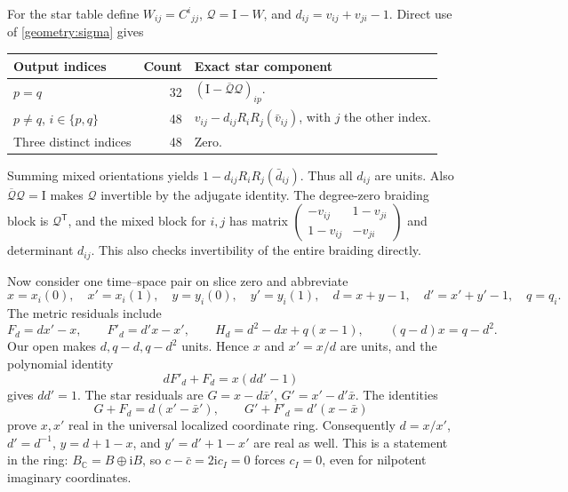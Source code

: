 \documentclass[11pt,a4paper]{article}
\theoremstyle{remark}\newtheorem{remark}[theorem]{Remark}
\newcommand{\Id}{\mathrm I}\newcommand{\F}{\mathbb F}
\begin{document}
For the star table define \(W_{ij}=C^i{}_{jj}\),
\(\mathscr Q=\Id-W\), and \(d_{ij}=v_{ij}+v_{ji}-1\).
Direct use of \eqref{geometry:sigma} gives
\begin{center}\small
\begin{tabular}{p{.31\linewidth}rp{.55\linewidth}}
\hline
Output indices&Count&Exact star component\\\hline
\(p=q\)&32&\((\Id-\overline{\mathscr Q}\mathscr Q)_{ip}\).\\
\(p\ne q\), \(i\in\{p,q\}\)&48&
\(v_{ij}-d_{ij}R_iR_j(\bar v_{ij})\), with \(j\) the other index.\\
Three distinct indices&48&Zero.\\\hline
\end{tabular}
\end{center}
Summing mixed orientations yields
\(1-d_{ij}R_iR_j(\bar d_{ij})\). Thus all \(d_{ij}\) are units.
Also \(\overline{\mathscr Q}\mathscr Q=\Id\) makes
\(\mathscr Q\) invertible by the adjugate identity. The degree-zero
braiding block is \(\mathscr Q^{\mathsf T}\), and the mixed block for
\(i,j\) has matrix
\(\left(\begin{smallmatrix}-v_{ij}&1-v_{ji}\\
1-v_{ij}&-v_{ji}\end{smallmatrix}\right)\)
and determinant \(d_{ij}\). This also checks invertibility of the entire
braiding directly.

Now consider one time--space pair on slice zero and abbreviate
\[
 x=x_i(0),\quad x'=x_i(1),\quad y=y_i(0),\quad y'=y_i(1),
 \quad d=x+y-1,\quad d'=x'+y'-1,\quad q=q_i.
\]
The metric residuals include
\[
 F_d=dx'-x,\qquad F'_d=d'x-x',\qquad
 H_d=d^2-dx+q(x-1),\qquad (q-d)x=q-d^2.
\]
Our open makes \(d,q-d,q-d^2\) units. Hence \(x\) and \(x'=x/d\)
are units, and the polynomial identity
\[
 dF'_d+F_d=x(dd'-1)
\]
gives \(dd'=1\). The star residuals are
\(G=x-d\bar x'\), \(G'=x'-d'\bar x\). The identities
\[
 G+F_d=d(x'-\bar x'),\qquad
 G'+F'_d=d'(x-\bar x)
\]
prove \(x,x'\) real in the universal localized coordinate ring.
Consequently \(d=x/x'\), \(d'=d^{-1}\), \(y=d+1-x\), and
\(y'=d'+1-x'\) are real as well. This is a statement in the ring:
\(B_{\mathbb C}=B\oplus\mathrm iB\), so
\(c-\bar c=2\mathrm i c_I=0\) forces \(c_I=0\), even for nilpotent
imaginary coordinates.
\end{document}
